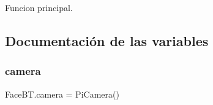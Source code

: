 Funcion principal. 



\subsection{Documentación de las variables}
\mbox{\label{namespace_face_b_t_a96f57377873e3c5cae0ad546f0a65bb7}} 
\subsubsection{\texorpdfstring{camera}{camera}}
{\footnotesize\ttfamily Face\+B\+T.\+camera = Pi\+Camera()}


